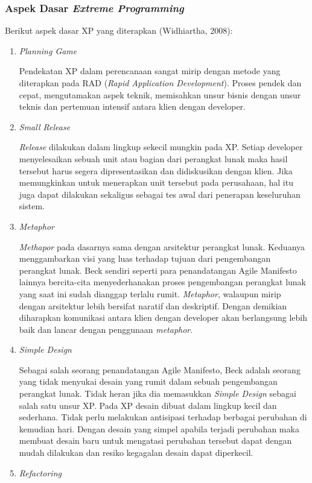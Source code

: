   \subsubsection{Aspek Dasar \emph{Extreme Programming}}
  Berikut aspek dasar XP yang diterapkan (Widhiartha, 2008):
  \begin{enumerate}
      \itemsep0em
      \item \emph{Planning Game}
      
      Pendekatan XP dalam perencanaan sangat mirip dengan metode yang diterapkan pada RAD (\emph{Rapid Application Development}). Proses pendek dan cepat, mengutamakan aspek teknik, memisahkan unsur bisnis dengan unsur teknis dan pertemuan intensif antara klien dengan developer.
      \item \emph{Small Release}
      
      \emph{Release} dilakukan dalam lingkup sekecil mungkin pada XP. Setiap developer menyelesaikan sebuah unit atau bagian dari perangkat lunak maka hasil tersebut harus segera dipresentasikan dan didiskusikan dengan klien. Jika memungkinkan untuk menerapkan unit tersebut pada perusahaan, hal itu juga dapat dilakukan sekaligus sebagai tes awal dari penerapan keseluruhan sistem.
      \item \emph{Metaphor}
      
      \emph{Methapor} pada dasarnya sama dengan arsitektur perangkat lunak. Keduanya menggambarkan visi yang luas terhadap tujuan dari pengembangan perangkat lunak. Beck sendiri seperti para penandatangan Agile Manifesto lainnya bercita-cita menyederhanakan proses pengembangan perangkat lunak yang saat ini sudah dianggap terlalu rumit. \emph{Metaphor}, walaupun mirip dengan arsitektur lebih bersifat naratif dan deskriptif. Dengan demikian diharapkan komunikasi antara klien dengan developer akan berlangsung lebih baik dan lancar dengan penggunaan \emph{metaphor}.
      \item \emph{Simple Design}
      
      Sebagai salah seorang penandatangan Agile Manifesto, Beck adalah seorang yang tidak menyukai desain yang rumit dalam sebuah pengembangan perangkat lunak. Tidak heran jika dia memasukkan \emph{Simple Design} sebagai salah satu unsur XP. Pada XP desain dibuat dalam lingkup kecil dan sederhana. Tidak perlu melakukan antisipasi terhadap berbagai perubahan di kemudian hari. Dengan desain yang simpel apabila terjadi perubahan maka membuat desain baru untuk mengatasi perubahan tersebut dapat dengan mudah dilakukan dan resiko kegagalan desain dapat diperkecil.
      \item \emph{Refactoring}
      

\end{enumerate}
